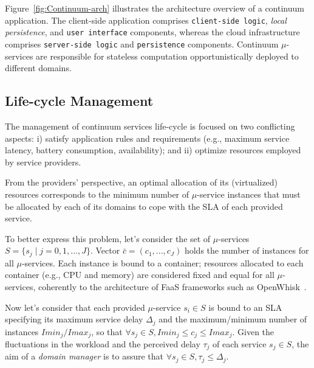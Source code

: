 Figure~\ref{fig:Continuum-arch} illustrates the architecture overview of a continuum application. The client-side application comprises \texttt{client-side logic}, \textit{local persistence}, and \texttt{user interface} components, whereas the cloud infrastructure comprises \texttt{server-side logic} and \texttt{persistence} components. Continuum $\mu$-services are responsible for stateless computation opportunistically deployed to different domains.

\subsection{Life-cycle Management}

The management of continuum services life-cycle is focused on two conflicting aspects: i) satisfy application rules and requirements (e.g., maximum service latency, battery consumption, availability); and ii) optimize resources employed by service providers. 

From the providers' perspective, an optimal allocation of its (virtualized) resources corresponds to the minimum number of $\mu$-service instances that must be allocated by each of its domains to cope with the SLA of each provided service.%

To better express this problem, let's consider the set of $\mu$-services $S = \{s_j \mid j = 0,1,...,J\}$.
Vector $\bar{c} = (c_1, ..., c_J)$ holds the number of instances for all $\mu$-services. Each instance is bound to a container; resources allocated to each container 
(e.g., CPU and memory) are considered fixed and equal for all $\mu$-services, coherently to the architecture of FaaS frameworks such as OpenWhisk~\cite{OpenWhisk}.

Now let's consider that each provided $\mu$-service $s_i \in S$ is bound to an SLA specifying its maximum service delay $\Delta_j$ and the maximum/minimum number of instances $Imin_{j}/Imax_{j}$, so that $\forall s_j \in S, Imin_j \le c_j \le Imax_j$. %
Given the fluctuations in the workload and the perceived delay $\tau_j$ of each service $s_j \in S$, the aim of a \textit{domain manager} is to assure that $\forall s_j \in S, \tau_j \le \Delta_j$.

